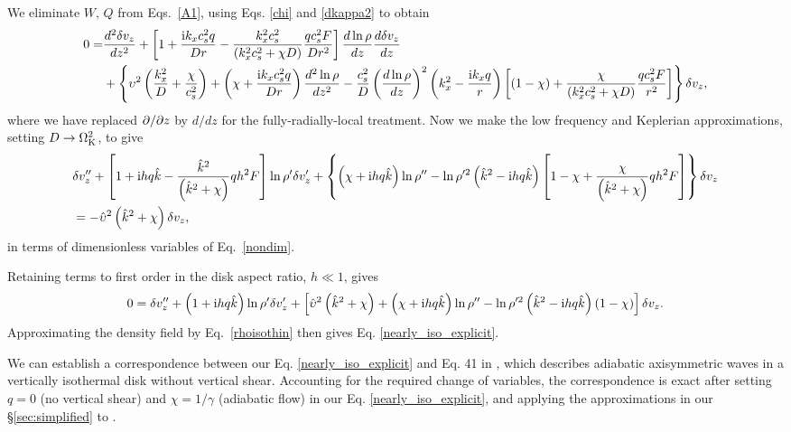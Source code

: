 We  eliminate $W,\, Q$ from Eqs.\ \ref{A1}, using  Eqs. \ref{chi} and \ref{dkappa2} to obtain  
\begin{align}\label{full_ode}
  0 =& \frac{d^2\delta v_z}{dz^2} + \left[1 + \frac{\mathrm{i} k_x c_s^2
      q}{Dr} - \frac{k_x^2c_s^2}{\left(k_x^2c_s^2 + \chi
        D\right)}\frac{qc_s^2F}{Dr^2}\right]\frac{d\ln\rho}{dz}\frac{d\delta
    v_z}{dz} \notag\\
  &+ \left\{\upsilon^2\left(\frac{k_x^2}{D} +
      \frac{\chi}{c_s^2}\right) + \left(\chi + \frac{\mathrm{i} k_x c_s^2
        q}{Dr}\right)\frac{d^2\ln\rho}{dz^2} -
    \frac{c_s^2}{D}\left(\frac{d\ln\rho}{dz}\right)^2\left(k_x^2 -
      \frac{\mathrm{i} k_x q}{r}\right)
   \left[\left(1-\chi\right) +
     \frac{\chi}{\left(k_x^2c_s^2 + \chi D\right)}\frac{qc_s^2 F}{r^2}\right] 
   \right\}\delta v_z, 
\end{align}
where we have replaced $\partial/\partial z$ by $d/dz$ for the
fully-radially-local treatment. Now we make the low frequency and Keplerian
approximations, setting $D\to 
\Omega_{\rm K}^2$, to give  
\begin{align}
  &\delta v_z ^{\prime\prime} + \left[1 + \mathrm{i} h q\hat{k} -
    \frac{ \hat{k}^2}{
      \left(\hat{k}^2+\chi\right)}q h^2F\right]\ln\rho^{\prime}\delta v_z^\prime +
  \left\{\left(\chi + \mathrm{i} h q
      \hat{k}\right)\ln\rho^{\prime\prime} - \ln\rho^{\prime
      2}\left(\hat{k}^2 -
      \mathrm{i} h
      q\hat{k}\right)\left[1 - \chi +
      \frac{\chi}{\left(\hat{k}^2+\chi\right)}qh^2F\right]\right\}\delta v_z \notag\\&=
  -\hat{\upsilon}^2\left(\hat{k}^2+\chi\right)\delta v_z\label{adia_diso3},
\end{align} 
in terms of dimensionless variables of Eq.\ \ref{nondim}.

Retaining terms to first order in the disk aspect ratio, $h \ll 1$, gives
\begin{align}
  0= \delta v_z ^{\prime\prime} + \left(1 + \mathrm{i} h
     q\hat{k}\right)\ln\rho^{\prime}\delta v_z^\prime 
   +
   \left[\hat{\upsilon}^2\left(\hat{k}^2+\chi\right) +
     \left(  \chi + \mathrm{i} h q\hat{k}\right)\ln\rho^{\prime\prime}
     - \ln\rho^{\prime
       2}\left(\hat{k}^2 -
       \mathrm{i} h
       q\hat{k}\right)\left(1 - \chi\right)\right]\delta v_z.\label{vertiso_gov_nondim}
\end{align}
Approximating the density field by Eq.\ \ref{rhoisothin} then gives 
Eq. \ref{nearly_iso_explicit}. 

We can establish a correspondence between our  Eq. \ref{nearly_iso_explicit} and
Eq. 41 in \cite{lubow93}, which describes adiabatic axisymmetric waves in
a vertically isothermal disk without vertical shear.   Accounting for the required change of variables, 
the correspondence is exact after setting $q=0$ (no vertical shear) and
$\chi=1/\gamma$ (adiabatic flow) in our Eq. \ref{nearly_iso_explicit},
and applying the approximations in our \S \ref{sec:simplified} to \citeauthor{lubow93}.    

